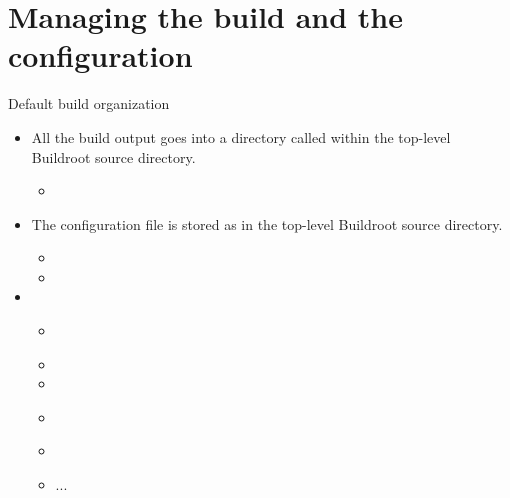 
\section{Managing the build and the configuration}

\begin{frame}{Default build organization}
  \begin{itemize}
  \item All the build output goes into a directory called
     within the top-level Buildroot source directory.
    \begin{itemize}
    \item {}
    \end{itemize}
  \item The configuration file is stored as  in the
    top-level Buildroot source directory.
    \begin{itemize}
    \item {}
    \item {}
    \end{itemize}
  \item {}
    \begin{itemize}
    \item {\bf {}}
    \item {}
    \item {}
    \item {\bf {}}
    \item {}
    \item ...
    \end{itemize}
  \end{itemize}
\end{frame}


